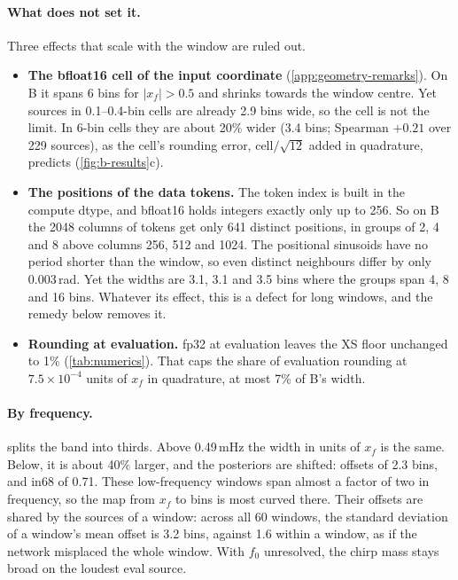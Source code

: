 \paragraph{What does not set it.}
Three effects that scale with the window are ruled out.
\begin{itemize}
  \item \textbf{The bfloat16 cell of the input coordinate} (\cref{app:geometry-remarks}). On B
        it spans 6 bins for $|x_f|>0.5$ and shrinks towards the window centre. Yet sources in 0.1--0.4-bin cells are already 2.9 bins wide, so the cell is not the
        limit. In 6-bin cells they are about 20\% wider (3.4 bins; Spearman $+0.21$ over 229
        sources), as the cell's rounding error, $\text{cell}/\sqrt{12}$ added in quadrature,
        predicts (\cref{fig:b-results}c).
  \item \textbf{The positions of the data tokens.} The token index is built in the compute
        dtype, and bfloat16 holds integers exactly only up to 256. So on B the 2048 columns of
        tokens get only 641 distinct positions, in groups of 2, 4 and 8 above columns 256, 512
        and 1024. The positional sinusoids have no period shorter than the window, so even
        distinct neighbours differ by only 0.003\,rad. Yet the widths are 3.1, 3.1 and 3.5
        bins where the groups span 4, 8 and 16 bins. Whatever its effect, this is a defect
        for long windows, and the remedy below removes it.
  \item \textbf{Rounding at evaluation.} fp32 at evaluation leaves the XS floor unchanged to
        1\% (\cref{tab:numerics}). That caps the share of evaluation rounding at
        $7.5\times10^{-4}$ units of $x_f$ in quadrature, at most 7\% of B's width.
\end{itemize}

\paragraph{By frequency.}
 splits the band into thirds. Above 0.49\,mHz the width in units of $x_f$
is the same. Below, it is about 40\% larger, and the posteriors are shifted: offsets of 2.3
bins, and in68 of 0.71. These low-frequency windows span almost a factor of two in frequency,
so the map from $x_f$ to bins is most curved there. Their offsets are shared by the sources of
a window: across all 60 windows, the standard deviation of a window's mean offset is 3.2 bins,
against 1.6 within a window, as if the network misplaced the whole window. With $f_0$ unresolved, the chirp mass stays broad on the loudest eval source.

